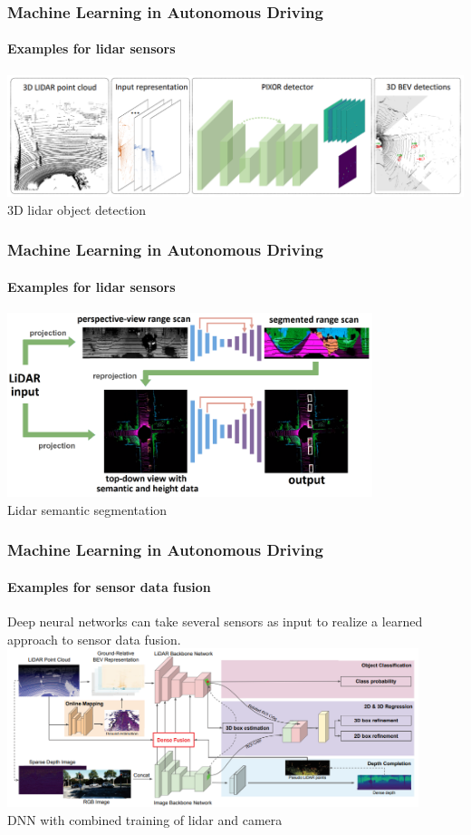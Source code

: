 \begin{frame}
\frametitle{Machine Learning in Autonomous Driving}
\framesubtitle{Examples for lidar sensors}
\centering
\includegraphics[width=\textwidth]{images/pixor_lidar_object_detection.png}\\
\footnotesize{3D lidar object detection \cite{Yang2018}}
\end{frame}

\begin{frame}
\frametitle{Machine Learning in Autonomous Driving}
\framesubtitle{Examples for lidar sensors}
\centering
\includegraphics[width=0.8\textwidth]{images/nvidia_lidar_semantic_segmentation.png}\\
\vspace{0.2cm}
\footnotesize{Lidar semantic segmentation \cite{Chen2020}}
\end{frame}

\begin{frame}
\frametitle{Machine Learning in Autonomous Driving}
\framesubtitle{Examples for sensor data fusion}
Deep neural networks can take several sensors as input to realize a learned
approach to sensor data fusion.\\
\vspace{0.25cm}
\centering
\includegraphics[width=0.9\textwidth]{images/uber_dnn_sensor_fusion.png}\\
\vspace{0.1cm}
\footnotesize{DNN with combined training of lidar and camera \cite{Liang2019}}
\end{frame}

